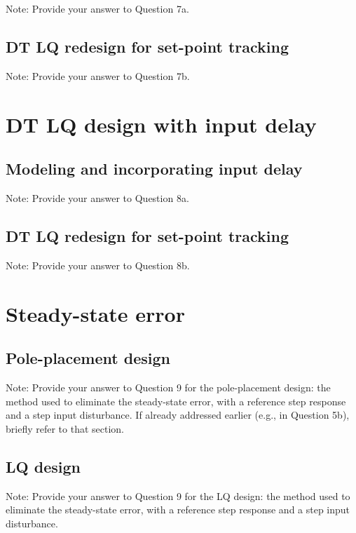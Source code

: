 \documentclass{article}
\begin{document}
{\color{red}Note: Provide your answer to Question 7a.}

\subsection{DT LQ redesign for set-point tracking}

{\color{red}Note: Provide your answer to Question 7b.}

\section{DT LQ design with input delay}

\subsection{Modeling and incorporating input delay}

{\color{red}Note: Provide your answer to Question 8a.}

\subsection{DT LQ redesign for set-point tracking}

{\color{red}Note: Provide your answer to Question 8b.}


\section{Steady-state error}

\subsection{Pole-placement design}

{\color{red}Note: Provide your answer to Question 9 for the pole-placement design: the method used to eliminate the steady-state error, with a reference step response and a step input disturbance. If already addressed earlier (e.g., in Question 5b), briefly refer to that section.}

\subsection{LQ design}

{\color{red}Note: Provide your answer to Question 9 for the LQ design: the method used to eliminate the steady-state error, with a reference step response and a step input disturbance.}







\end{document}
